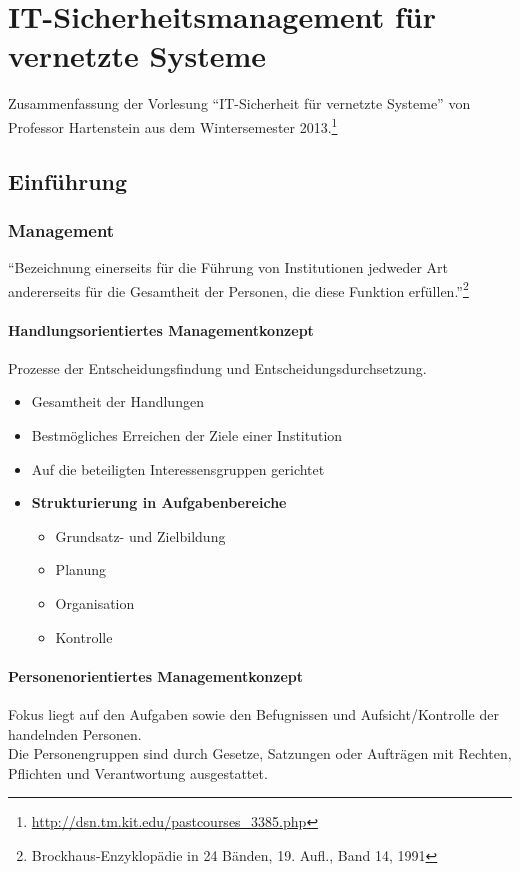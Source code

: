 \chapter{IT-Sicherheitsmanagement für vernetzte Systeme}
Zusammenfassung der Vorlesung  "`IT-Sicherheit für vernetzte Systeme"' von Professor Hartenstein aus dem Wintersemester 2013.\footnote{\url{http://dsn.tm.kit.edu/pastcourses_3385.php}}

\section{Einführung}

\subsection{Management}
"`Bezeichnung einerseits für die Führung von Institutionen jedweder Art andererseits für die Gesamtheit der Personen, die diese Funktion erfüllen."'\footnote{Brockhaus-Enzyklopädie in 24 Bänden, 19. Aufl., Band 14, 1991}

\subsubsection{Handlungsorientiertes Managementkonzept}
Prozesse der Entscheidungsfindung und Entscheidungsdurchsetzung.
\begin{itemize}
	\item Gesamtheit der Handlungen
	\item Bestmögliches Erreichen der Ziele einer Institution
	\item Auf die beteiligten Interessensgruppen gerichtet
	\item \textbf{Strukturierung in Aufgabenbereiche}
	\begin{itemize}
		\item Grundsatz- und Zielbildung
		\item Planung
		\item Organisation
		\item Kontrolle
	\end{itemize}
\end{itemize}

\subsubsection{Personenorientiertes Managementkonzept}
Fokus liegt auf den Aufgaben sowie den Befugnissen und Aufsicht/Kontrolle der handelnden Personen.\\
Die Personengruppen sind durch Gesetze, Satzungen oder Aufträgen mit Rechten, Pflichten und Verantwortung ausgestattet.

